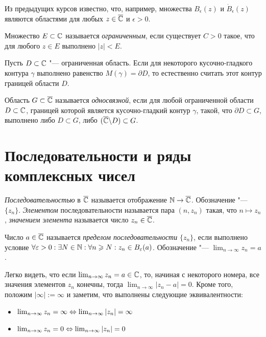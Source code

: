 \begin{note}
	Из предыдущих курсов известно, что, например, множества $B_\epsilon(z)$ и $\dot B_\epsilon(z)$ являются областями для любых $z \in \overline{\mathbb{C}}$ и $\epsilon > 0$.
\end{note}

\begin{definition}
	Множество $E \subset \mathbb{C}$ называется \textit{ограниченным}, если существует $C > 0$ такое, что для любого $z \in E$ выполнено $|z| < E$.
\end{definition}

\begin{note}
	Пусть $D \subset \mathbb{C}$ "--- ограниченная область. Если для некоторого кусочно-гладкого контура $\gamma$ выполнено равенство $M(\gamma) = \partial D$, то естественно считать этот контур границей области $D$.
\end{note}

\begin{definition}
	Область $G \subset \overline{\mathbb{C}}$ называется \textit{односвязной}, если для любой ограниченной области $D \subset \mathbb{C}$, границей которой является кусочно-гладкий контур $\gamma$, такой, что $\partial D \subset G$, выполнено либо $D \subset G$, либо $(\overline{\mathbb{C}} \backslash D) \subset G$.
\end{definition}

\section{Последовательности и ряды комплексных чисел}

\begin{definition}
	\textit{Последовательностью} в $\overline{\mathbb{C}}$ называется отображение $\mathbb{N} \to \overline{\mathbb{C}}$. Обозначение "--- $\{z_n\}$. \textit{Элементом} последовательности называется пара $(n, z_n)$ такая, что $n \mapsto z_n$, \textit{значением элемента} называется число $z_n \in \overline{\mathbb{C}}$.
\end{definition}

\begin{definition}
	Число $a \in \overline{\mathbb{C}}$ называется \textit{пределом последовательности} $\{z_n\}$, если выполнено условие $\forall \varepsilon > 0 : \exists N \in \mathbb{N}: \forall n \geqslant N: z_n \in B_{\varepsilon}(a)$. Обозначение "--- $\lim_{n \to \infty}z_n = a$.
\end{definition}

\begin{note}
	Легко видеть, что если $\lim_{n \to \infty}z_n = a \in \mathbb{C}$, то, начиная с некоторого номера, все значения элементов $z_n$ конечны, тогда $\lim_{n \to \infty}|z_n - a| = 0$. Кроме того, положим $|\infty| := \infty$ и заметим, что выполнены следующие эквивалентности:
	\begin{itemize}
		\item $\lim_{n \to \infty}z_n = \infty \Leftrightarrow \lim_{n \to \infty}|z_n| = \infty$
		\item $\lim_{n \to \infty}z_n = 0 \Leftrightarrow \lim_{n \to \infty}|z_n| = 0$
	\end{itemize}
\end{note}

